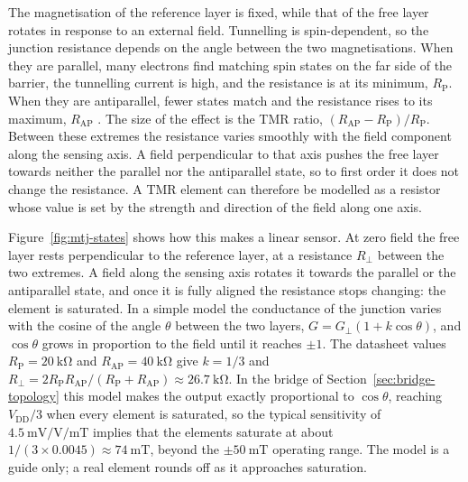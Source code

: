 \documentclass[12pt,a4paper]{article}
\begin{document}
The magnetisation of the reference layer is fixed, while that of the free layer rotates in response to an external field. Tunnelling is spin-dependent, so the junction resistance depends on the angle between the two magnetisations. When they are parallel, many electrons find matching spin states on the far side of the barrier, the tunnelling current is high, and the resistance is at its minimum, $R_{\text{P}}$. When they are antiparallel, fewer states match and the resistance rises to its maximum, $R_{\text{AP}}$ \cite{julliere1975}. The size of the effect is the TMR ratio, $(R_{\text{AP}} - R_{\text{P}})/R_{\text{P}}$. Between these extremes the resistance varies smoothly with the field component along the sensing axis. A field perpendicular to that axis pushes the free layer towards neither the parallel nor the antiparallel state, so to first order it does not change the resistance. A TMR element can therefore be modelled as a resistor whose value is set by the strength and direction of the field along one axis.

Figure~\ref{fig:mtj-states} shows how this makes a linear sensor. At zero field the free layer rests perpendicular to the reference layer, at a resistance $R_\perp$ between the two extremes. A field along the sensing axis rotates it towards the parallel or the antiparallel state, and once it is fully aligned the resistance stops changing: the element is saturated. In a simple model the conductance of the junction varies with the cosine of the angle $\theta$ between the two layers, $G = G_\perp (1 + k\cos\theta)$, and $\cos\theta$ grows in proportion to the field until it reaches $\pm 1$. The datasheet values $R_{\text{P}} = \SI{20}{\kilo\ohm}$ and $R_{\text{AP}} = \SI{40}{\kilo\ohm}$ give $k = 1/3$ and $R_\perp = 2R_{\text{P}}R_{\text{AP}}/(R_{\text{P}}+R_{\text{AP}}) \approx \SI{26.7}{\kilo\ohm}$. In the bridge of Section~\ref{sec:bridge-topology} this model makes the output exactly proportional to $\cos\theta$, reaching $V_{\text{DD}}/3$ when every element is saturated, so the typical sensitivity of $\SI{4.5}{\milli\volt\per\volt\per\milli\tesla}$ implies that the elements saturate at about $1/(3 \times 0.0045) \approx \SI{74}{\milli\tesla}$, beyond the $\pm\SI{50}{\milli\tesla}$ operating range. The model is a guide only; a real element rounds off as it approaches saturation.
\end{document}
